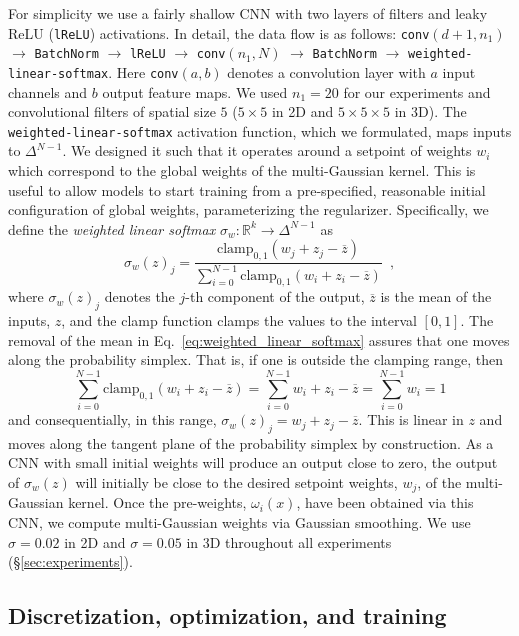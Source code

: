 \documentclass[10pt,twocolumn,letterpaper,table]{article}
\numberwithin{equation}{section}
\theoremstyle{plain}
\theoremstyle{definition}
\begin{document}
For simplicity we use a fairly shallow CNN with two layers of 
filters and leaky ReLU (\texttt{lReLU}) \cite{Maas13a} activations.
In detail, the data flow is as follows: 
\texttt{conv$(d+1,n_1)$} $\rightarrow$ \texttt{BatchNorm} $\rightarrow$ \texttt{lReLU} $\rightarrow$ \texttt{conv$(n_1,N)$} $\rightarrow$ \texttt{BatchNorm} $\rightarrow$ \texttt{weighted-linear-softmax}. Here \texttt{conv$(a,b)$} denotes a convolution layer with $a$ input channels and $b$ output feature maps. We used $n_1=20$ for our experiments and convolutional filters of spatial size $5$ ($5\times 5$ in 2D and $5\times 5\times 5$ in 3D). The \texttt{weighted-linear-softmax} activation function, which we formulated, maps inputs to $\Delta^{N-1}$. We designed it such that it operates around a setpoint of weights $w_i$ which correspond to the global weights of the multi-Gaussian kernel. This is useful to allow models to start training from a pre-specified, reasonable initial configuration of global weights, parameterizing the regularizer. Specifically, we define the {\it weighted linear softmax} $\sigma_w: \mathbb{R}^k \to \Delta^{N-1}$ as \begin{equation}
  \sigma_w(z)_j = \frac{\text{clamp}_{0,1}(w_j+z_j-\overline{z})}{\sum_{i=0}^{N-1} \text{clamp}_{0,1}(w_i+z_i-\overline{z})} \enspace,
  \label{eq:weighted_linear_softmax}
\end{equation}
where $\sigma_w(z)_j$ denotes the $j$-th component of the output, $\overline{z}$ is the mean of the inputs, $z$, and the clamp function clamps the values to the interval $[0,1]$. The removal of the mean in Eq.~\eqref{eq:weighted_linear_softmax} assures that one moves along the probability simplex. That is, if one is outside the clamping range, then 
$$\sum_{i=0}^{N-1} \text{clamp}_{0,1}(w_i+z_i-\overline{z}) = \sum_{i=0}^{N-1} w_i + z_i-\overline{z} = \sum_{i=0}^{N-1} w_i = 1$$
and consequentially, in this range, $\sigma_w(z)_j=w_j+z_j-\overline{z}$. This is linear in $z$ and moves along the tangent plane of the probability simplex by construction. 
As a CNN with small initial weights will produce an output close to zero, the output of $\sigma_w(z)$ will initially be close to the desired setpoint weights, $w_j$, of the multi-Gaussian kernel. 
Once the pre-weights, $\omega_i(x)$, have been obtained via this CNN, we compute multi-Gaussian weights via Gaussian smoothing. We use $\sigma=0.02$ in 2D and $\sigma=0.05$ in 3D throughout all experiments (\S\ref{sec:experiments}).

\subsection{Discretization, optimization, and training}
\label{subsec:discretization_optimization_training}
\end{document}
